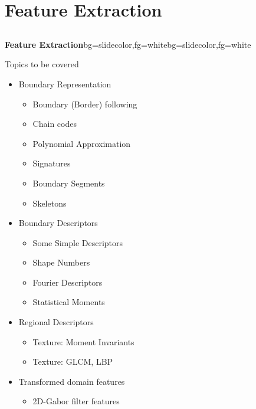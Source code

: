 \section{Feature Extraction}
\subsection{}
\begin{frame}{}
\begin{variableblock}{\centering \Large \textbf{\vspace{4pt}\newline Feature Extraction\vspace{4pt}}}{bg=slidecolor,fg=white}{bg=slidecolor,fg=white}
\end{variableblock}
\end{frame}

\begin{frame}{Topics to be covered}
\begin{itemize}
\item Boundary Representation\nocite{gonzalez2002digital}
\begin{itemize}
\setlength{\itemsep}{-2pt}
\item Boundary (Border) following
\item Chain codes
\item Polynomial Approximation
\item Signatures
\item Boundary Segments
\item Skeletons
\end{itemize}
\item Boundary Descriptors
\begin{itemize}
\setlength{\itemsep}{-2pt}
\item Some Simple Descriptors
\item Shape Numbers
\item Fourier Descriptors
\item Statistical Moments
\end{itemize}
\item Regional Descriptors
\begin{itemize}
\setlength{\itemsep}{-2pt}
\item Texture: Moment Invariants
\item Texture: GLCM, LBP
\end{itemize}
\item Transformed domain features
\begin{itemize}
\item 2D-Gabor filter features
\end{itemize}
\end{itemize}
\end{frame}

